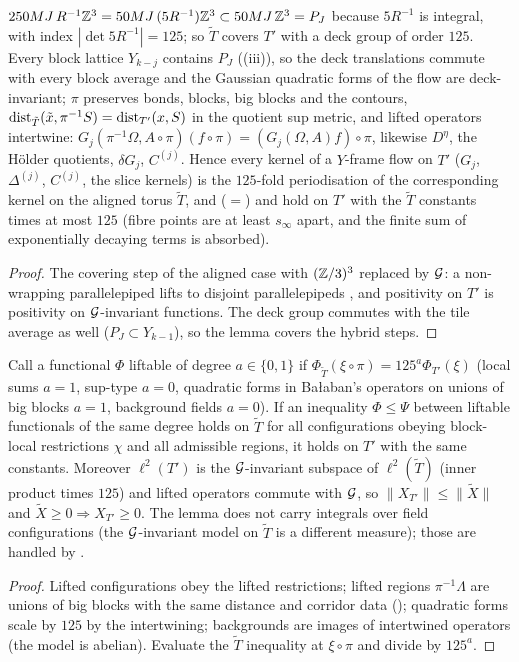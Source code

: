 \begin{lemma}[folding]\label{rot:lem:F}
$250MJ\,R^{-1}\mathbb Z^3=50MJ\,(5R^{-1})\mathbb Z^3\subset50MJ\,\mathbb Z^3=P_J$ because $5R^{-1}$ is integral, with index $|\det5R^{-1}|=125$; so $\tilde T$ covers $T'$ with a deck group of order $125$. Every block lattice $Y_{k-j}$ contains $P_J$ ((iii)), so the deck translations commute with every block average and the Gaussian quadratic forms of the flow are deck-invariant; $\pi$ preserves bonds, blocks, big blocks and the contours, $\operatorname{dist}_{\tilde T}(\tilde x,\pi^{-1}S)=\operatorname{dist}_{T'}(x,S)$ in the quotient sup metric, and lifted operators intertwine: $G_j(\pi^{-1}\Omega,A\circ\pi)(f\circ\pi)=(G_j(\Omega,A)f)\circ\pi$, likewise $D^\eta$, the H\"older quotients, $\delta G_j$, $C^{(j)}$. Hence every kernel of a $Y$-frame flow on $T'$ ($G_j$, $\Delta^{(j)}$, $C^{(j)}$, the slice kernels) is the $125$-fold periodisation of the corresponding kernel on the aligned torus $\tilde T$, and \cite[Props.~2.1--2.3]{Ba1} ($=$\cite{Ba4}) and \cite[Thm.~3.3]{K1} hold on $T'$ with the $\tilde T$ constants times at most $125$ (fibre points are at least $s_\infty$ apart, and the finite sum of exponentially decaying terms is absorbed).
\end{lemma}
\begin{proof}
The covering step of the aligned case with $(\mathbb Z/3)^3$ replaced by $\mathcal G$: a non-wrapping parallelepiped lifts to disjoint parallelepipeds \cite[p.~611]{Ba1}, and positivity on $T'$ is positivity on $\mathcal G$-invariant functions. The deck group commutes with the tile average as well ($P_J\subset Y_{k-1}$), so the lemma covers the hybrid steps.
\end{proof}

\begin{lemma}\label{rot:lem:D}
Call a functional $\Phi$ liftable of degree $a\in\{0,1\}$ if $\Phi_{\tilde T}(\xi\circ\pi)=125^a\Phi_{T'}(\xi)$ (local sums $a=1$, sup-type $a=0$, quadratic forms in Ba{\l}aban's operators on unions of big blocks $a=1$, background fields $a=0$). If an inequality $\Phi\le\Psi$ between liftable functionals of the same degree holds on $\tilde T$ for all configurations obeying block-local restrictions $\chi$ and all admissible regions, it holds on $T'$ with the same constants. Moreover $\ell^2(T')$ is the $\mathcal G$-invariant subspace of $\ell^2(\tilde T)$ (inner product times $125$) and lifted operators commute with $\mathcal G$, so $\|X_{T'}\|\le\|\tilde X\|$ and $\tilde X\ge0\Rightarrow X_{T'}\ge0$. The lemma does not carry integrals over field configurations (the $\mathcal G$-invariant model on $\tilde T$ is a different measure); those are handled by .
\end{lemma}
\begin{proof}
Lifted configurations obey the lifted restrictions; lifted regions $\pi^{-1}\Lambda$ are unions of big blocks with the same distance and corridor data (); quadratic forms scale by $125$ by the intertwining; backgrounds are images of intertwined operators (the model is abelian). Evaluate the $\tilde T$ inequality at $\xi\circ\pi$ and divide by $125^a$.
\end{proof}

